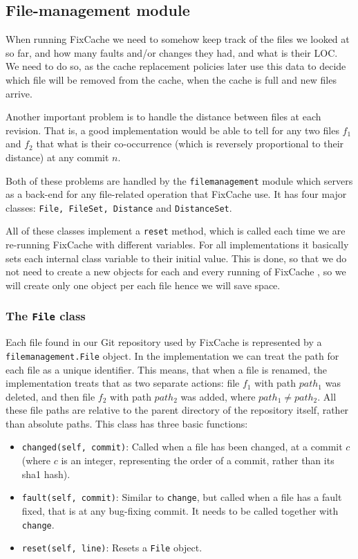 \documentclass[12pt,twoside,notitlepage]{report}
\newcommand{\fxch}{FixCache }
\begin{document}
\subsection{File-management module}
When running \fxch we need to somehow keep track of the files we looked at so far, and how many faults and/or changes they had, and what is their LOC. We need to do so, as the cache replacement policies later use this data to decide which file will be removed from the cache, when the cache is full and new files arrive.

Another important problem is to handle the distance between files at each revision. That is, a good implementation would be able to tell for any two files $f_1$ and $f_2$ that what is their co-occurrence (which is reversely proportional to their distance) at any commit $n$.

Both of these problems are handled by the \texttt{filemanagement} module which servers as a back-end for any file-related operation that \fxch use. It has four major classes: \texttt{File, FileSet, Distance} and \texttt{DistanceSet}.

All of these classes implement a \texttt{reset} method, which is called each time we are re-running \fxch with different variables. For all implementations it basically sets each internal class variable to their initial value. This is done, so that we do not need to create a new objects for each and every running of \fxch, so we will create only one object per each file hence we will save space.
\subsubsection*{The \texttt{File} class}
Each file found in our Git repository used by \fxch is represented by a \texttt{filemanagement.File} object. In the implementation we can treat the path for each file as a unique identifier. This means, that when a file is renamed, the implementation treats that as two separate actions: file $f_1$ with path $path_1$ was deleted, and then file $f_2$ with path $path_2$ was added, where $path_1 \neq path_2$. All these file paths are relative to the parent directory of the repository itself, rather than absolute paths. This class has three basic functions:
\begin{itemize}
\item \texttt{changed(self, commit)}: Called when a file has been changed, at a commit $c$ (where $c$ is an integer, representing the order of a commit, rather than its sha1 hash).
\item \texttt{fault(self, commit)}: Similar to \texttt{change}, but called when a file has a fault fixed, that is at any bug-fixing commit. It needs to be called together with \texttt{change}.
\item \texttt{reset(self, line)}: Resets a \texttt{File} object.
\end{itemize}
\end{document}
